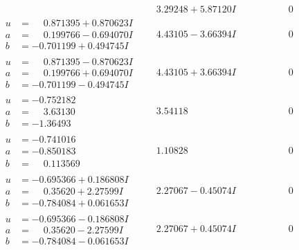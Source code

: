 \documentclass[1p]{elsarticle_modified}
\theoremstyle{definition}
\begin{document}
$$\begin{array}{c|c|c}
 & \phantom{-}3.29248 + 5.87120 I & \phantom{-0.000000 } 0 \\ \hline\begin{aligned}
u &= \phantom{-}0.871395 + 0.870623 I \\
a &= \phantom{-}0.199766 - 0.694070 I \\
b &= -0.701199 + 0.494745 I\end{aligned}
 & \phantom{-}4.43105 - 3.66394 I & \phantom{-0.000000 } 0 \\ \hline\begin{aligned}
u &= \phantom{-}0.871395 - 0.870623 I \\
a &= \phantom{-}0.199766 + 0.694070 I \\
b &= -0.701199 - 0.494745 I\end{aligned}
 & \phantom{-}4.43105 + 3.66394 I & \phantom{-0.000000 } 0 \\ \hline\begin{aligned}
u &= -0.752182\phantom{ +0.000000I} \\
a &= \phantom{-}3.63130\phantom{ +0.000000I} \\
b &= -1.36493\phantom{ +0.000000I}\end{aligned}
 & \phantom{-}3.54118\phantom{ +0.000000I} & \phantom{-0.000000 } 0 \\ \hline\begin{aligned}
u &= -0.741016\phantom{ +0.000000I} \\
a &= -0.850183\phantom{ +0.000000I} \\
b &= \phantom{-}0.113569\phantom{ +0.000000I}\end{aligned}
 & \phantom{-}1.10828\phantom{ +0.000000I} & \phantom{-0.000000 } 0 \\ \hline\begin{aligned}
u &= -0.695366 + 0.186808 I \\
a &= \phantom{-}0.35620 + 2.27599 I \\
b &= -0.784084 + 0.061653 I\end{aligned}
 & \phantom{-}2.27067 - 0.45074 I & \phantom{-0.000000 } 0 \\ \hline\begin{aligned}
u &= -0.695366 - 0.186808 I \\
a &= \phantom{-}0.35620 - 2.27599 I \\
b &= -0.784084 - 0.061653 I\end{aligned}
 & \phantom{-}2.27067 + 0.45074 I & \phantom{-0.000000 } 0 \\ \hline\begin{aligned}

\end{aligned}
\end{array}$$
\end{document}
